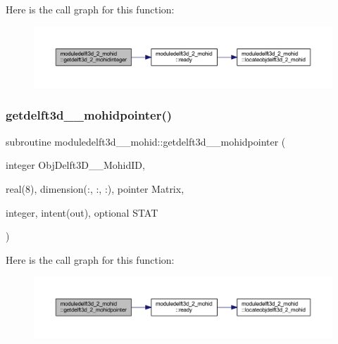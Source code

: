Here is the call graph for this function\+:\nopagebreak
\begin{figure}[H]
\begin{center}
\leavevmode
\includegraphics[width=350pt]{namespacemoduledelft3d__2__mohid_a5500fdcc30972ef82a49b8924a5a44fe_cgraph}
\end{center}
\end{figure}
\mbox{\label{namespacemoduledelft3d__2__mohid_a13721b790965b5497115a3fa554de497}} 
\subsubsection{\texorpdfstring{getdelft3d\+\_\+\_\+mohidpointer()}{getdelft3d\_2\_mohidpointer()}}
{\footnotesize\ttfamily subroutine moduledelft3d\+\_\+\_\+mohid\+::getdelft3d\+\_\+\_\+mohidpointer (\begin{DoxyParamCaption}\item[{integer}]{Obj\+Delft3\+D\+\_\+\_\+\+Mohid\+ID,  }\item[{real(8), dimension(\+:, \+:, \+:), pointer}]{Matrix,  }\item[{integer, intent(out), optional}]{S\+T\+AT }\end{DoxyParamCaption})\hspace{0.3cm}{\ttfamily [private]}}

Here is the call graph for this function\+:\nopagebreak
\begin{figure}[H]
\begin{center}
\leavevmode
\includegraphics[width=350pt]{namespacemoduledelft3d__2__mohid_a13721b790965b5497115a3fa554de497_cgraph}
\end{center}
\end{figure}
\mbox{\label{namespacemoduledelft3d__2__mohid_a6a2192c5c8e2b5565ca4a3b91cd0ff48}} 
